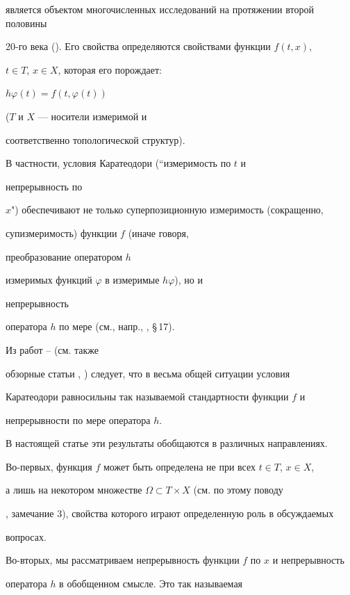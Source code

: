 является объектом многочисленных исследований на протяжении второй половины


20-го века (\cite{App}). Его свойства определяются свойствами функции $f(t,x)$,


$t\in T$, $x\in X$, которая его порождает:


$h\varphi (t)=f(t,\varphi (t))$


($T$ и $X$ --- носители измеримой и


соответственно топологической структур).





В частности, условия Каратеодори (``измеримость по $t$ и


непрерывность по


$x$") обеспечивают не только суперпозиционную измеримость (сокращенно,


супизмеримость) функции $f$ (иначе говоря,


преобразование оператором $h$


измеримых функций $\varphi$ в измеримые $h\varphi$), но и


непрерывность


оператора $h$ по мере (см., напр., \cite{Kra}, \S\,17).


Из работ \cite{Sh1}--\cite{Nep2} (см. также


обзорные статьи \cite{Sh3}, \cite{Sh4}) следует, что в весьма общей ситуации условия


Каратеодори равносильны так называемой стандартности функции $f$ и


непрерывности по мере оператора $h$.





В настоящей статье эти результаты обобщаются в различных направлениях.


Во-первых, функция $f$ может быть определена не при всех $t\in T$, $x\in X$,


а лишь на некотором множестве $\Omega\subset T\times X$ (см. по этому поводу


\cite{Nep2}, замечание 3), свойства которого играют определенную роль в обсуждаемых


вопросах.





Во-вторых, мы рассматриваем непрерывность функции $f$ по $x$ и непрерывность


оператора $h$ в обобщенном смысле. Это так называемая


